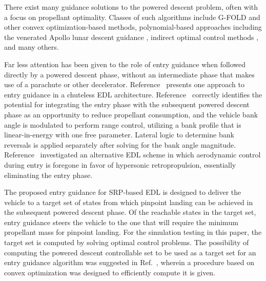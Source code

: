 \documentclass[letterpaper, paper,11pt]{AAS}
\begin{document}

There exist many guidance solutions to the powered descent problem, often with a focus on propellant optimality. Classes of such algorithms include G-FOLD \cite{gfold,gfold_flighttests} and other convex optimization-based methods, polynomial-based approaches including the venerated Apollo lunar descent guidance \cite{apollo_lunar}, indirect optimal control methods \cite{PropellantOptimalAdaptiveTrigger}, and many others. 

Far less attention has been given to the role of entry guidance when followed directly by a powered descent phase, without an intermediate phase that makes use of a parachute or other decelerator. Reference~\cite{LuAdaptiveEDL} presents one approach to entry guidance in a chuteless EDL architecture. Reference~\cite{LuAdaptiveEDL} correctly identifies the potential for integrating the entry phase with the subsequent powered descent phase as an opportunity to reduce propellant consumption, and the vehicle bank angle is modulated to perform range control, utilizing a bank profile that is linear-in-energy with one free parameter. Lateral logic to determine bank reversals is applied separately after solving for the bank angle magnitude. Reference~\cite{EDL_AllProp} investigated an alternative EDL scheme in which aerodynamic control during entry is foregone in favor of hypersonic retropropulsion, essentially eliminating the entry phase. 

The proposed entry guidance for SRP-based EDL is designed to deliver the vehicle to a target set of states from which pinpoint landing can be achieved in the subsequent powered descent phase. Of the reachable states in the target set, entry guidance steers the vehicle to the one that will require the minimum propellant mass for pinpoint landing. For the simulation testing in this paper, the target set is computed by solving optimal control problems. 
The possibility of computing the powered descent controllable set to be used as a target set for an entry guidance algorithm was suggested in Ref.~\cite{SRP_ControllableSets}, wherein a procedure based on convex optimization was designed to efficiently compute it is given.
\end{document}
